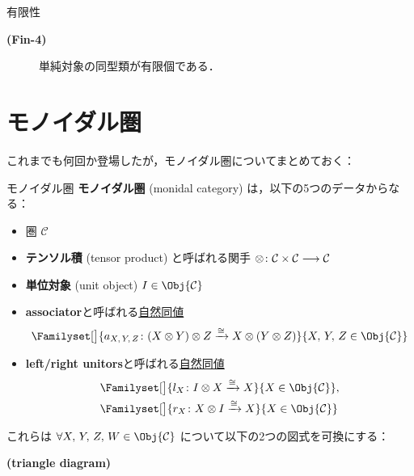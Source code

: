 \documentclass[TQFT_main]{subfiles}
\begin{document}
\begin{mydef}[label=def:finite-abcat]{有限性}
\begin{itemize}
\begin{description}
                \item[\textbf{(Fin-4)}] 単純対象の同型類が有限個である．
            \end{description}
        \end{itemize}
        
    \end{mydef}


    \section{モノイダル圏}

    これまでも何回か登場したが，モノイダル圏についてまとめておく：

    \begin{mydef}[label=redef:monoidal-category,breakable]{モノイダル圏}
        \textbf{モノイダル圏} (monidal category) は，以下の5つのデータからなる：
        \begin{itemize}
            \item 圏 $\mathcal{C}$
            \item \textbf{テンソル積} (tensor product) と呼ばれる関手 $\otimes \colon \mathcal{C} \times \mathcal{C} \longrightarrow \mathcal{C}$
            \item \textbf{単位対象} (unit object) $I \in \Obj{\mathcal{C}}$
            \item \textbf{associator}と呼ばれる\hyperref[def:nat]{自然同値}
            \begin{align}
                \Familyset[\big]{a_{X,\, Y,\, Z} \colon (X \otimes Y) \otimes Z \xrightarrow{\cong} X \otimes (Y \otimes Z)}{X,\, Y,\, Z \in \Obj{\mathcal{C}}}
            \end{align}
            \item \textbf{left/right unitors}と呼ばれる\hyperref[def:nat]{自然同値}
            \begin{align}
                &\Familyset[\big]{l_X \colon I \otimes X \xrightarrow{\cong} X}{X \in \Obj{\mathcal{C}}}, \\
                &\Familyset[\big]{r_X \colon X \otimes I \xrightarrow{\cong} X}{X \in \Obj{\mathcal{C}}}
            \end{align}
            
        \end{itemize}
        これらは $\forall X,\, Y,\, Z,\, W \in \Obj{\mathcal{C}}$ について以下の2つの図式を可換にする：
        \begin{description}
            \item[\textbf{(triangle diagram)}]　
            

\end{description}
\end{mydef}
\end{document}
